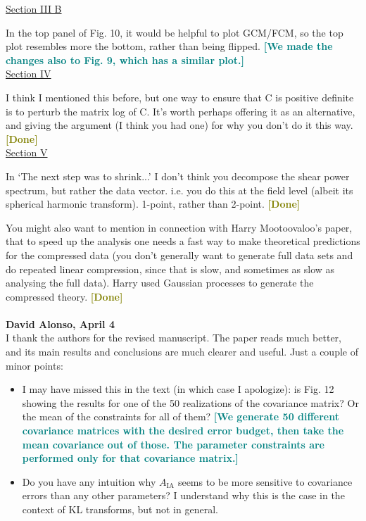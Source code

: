 \documentclass{article}
\newcommand\reply[1]{{\bf {\textcolor{teal}{[#1]}}}}
\newcommand\done{{\bf {\textcolor{olive}{[Done]}}}}
\begin{document}
    \underline{Section III B}
    
    In the top panel of Fig. 10, it would be helpful to plot GCM/FCM, so the top plot resembles more the bottom, rather than being flipped. \reply{We made the changes also to Fig. 9, which has a similar plot.}\\
    
    \underline{Section IV}
    
    I think I mentioned this before, but one way to ensure that C is positive definite is to perturb the matrix log of C.  It’s worth perhaps offering it as an alternative, and giving the argument (I think you had one) for why you don’t do it this way. \done \\
    
    \underline{Section V}
    
    In ‘The next step was to shrink...’ I don’t think you decompose the shear power spectrum, but rather the data vector.  i.e. you do this at the field level (albeit its spherical harmonic transform).  1-point, rather than 2-point. \done

    You might also want to mention in connection with Harry Mootoovaloo’s paper, that to speed up the analysis one needs a fast way to make theoretical predictions for the compressed data (you don’t generally want to generate full data sets and do repeated linear compression, since that is slow, and sometimes as slow as analysing the full data).  Harry used Gaussian processes to generate the compressed theory. \done \\  \\
	
	
	\textbf{David Alonso, April 4} \\

    I thank the authors for the revised manuscript. The paper reads much better, and its main results and conclusions are much clearer and useful. Just a couple of minor points:
    \begin{itemize}
        \item I may have missed this in the text (in which case I apologize): is Fig. 12 showing the results for one of the 50 realizations of the covariance matrix? Or the mean of the constraints for all of them? \reply{We generate 50 different covariance matrices with the desired error budget, then take the mean covariance out of those. The parameter constraints are performed only for that covariance matrix.}
        \item Do you have any intuition why $A_{\mathrm{IA}}$ seems to be more sensitive to covariance errors than any other parameters? I understand why this is the case in the context of KL transforms, but not in general. \\  \\
    \end{itemize}
	
\end{document}
